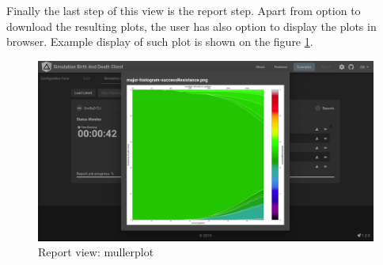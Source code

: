 Finally the last step of this view is the report step. Apart from option to download the resulting plots, the user has also option to display the plots in browser. Example display of such plot is shown on the figure \ref{fig:sp-report-muller}.
\begin{figure}[h!]
	\centering
		\includegraphics[width=0.9\linewidth]{screens/report-view-muller.png}
	\caption{Report view: mullerplot}
	\label{fig:sp-report-muller}
\end{figure}
\newpage
